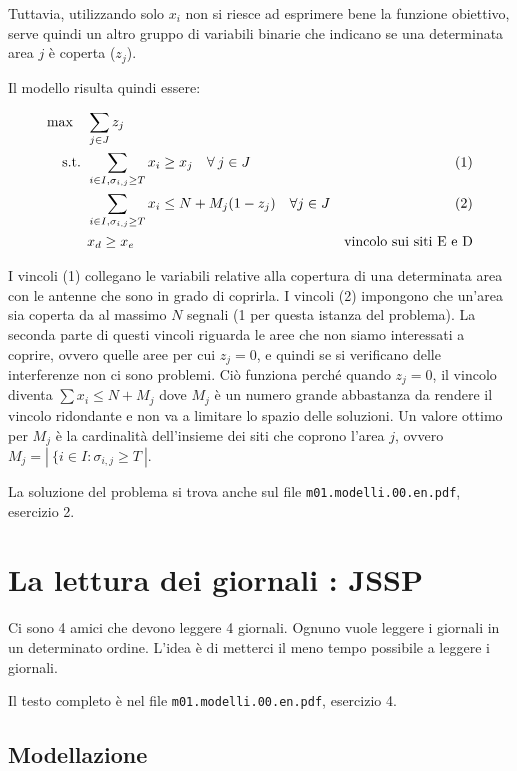 Tuttavia, utilizzando solo $x_i$ non si riesce ad esprimere bene la funzione obiettivo, serve quindi un altro gruppo di variabili binarie che indicano se una determinata area $j$ è coperta ($z_j$).

Il modello risulta quindi essere:

\begin{align*}
\max \quad & \sum\limits_{j \in J} z_j \\
\text{s.t. } & \sum\limits_{i \in I, \sigma_{i,j} \geq T} x_i \geq x_j \quad \forall \: j \in J &\text{(1)}\\
	& \sum\limits_{i \in I, \sigma_{i,j} \geq T} x_i \leq N + M_j(1-z_j) \quad \forall j \in J &\text{(2)} \\
	& x_d \geq x_e & \text{vincolo sui siti E e D}
\end{align*}

\noindent I vincoli (1) collegano le variabili relative alla copertura di una determinata area con le antenne che sono in grado di coprirla.
I vincoli (2) impongono che un'area sia coperta da al massimo $N$ segnali (1 per questa istanza del problema). 
La seconda parte di questi vincoli riguarda le aree che non siamo interessati a coprire, ovvero quelle aree per cui $z_j = 0$, e quindi se si verificano delle interferenze non ci sono problemi. Ciò funziona perché quando $z_j = 0$, il vincolo diventa $\sum x_i\leq N+M_j$ dove $M_j$ è un numero grande abbastanza da rendere il vincolo ridondante e non va a limitare lo spazio delle soluzioni.
Un valore ottimo per $M_j$ è la cardinalità dell'insieme dei siti che coprono l'area $j$, ovvero $M_j = | \: \{i \in I : \sigma_{i,j} \geq T \: |$.

La soluzione del problema si trova anche sul file \texttt{m01.modelli.00.en.pdf}, esercizio 2.

\section{La lettura dei giornali : JSSP}

Ci sono 4 amici che devono leggere 4 giornali. Ognuno vuole leggere i giornali in un determinato ordine. L'idea è di metterci il meno tempo possibile a leggere i giornali.

Il testo completo è nel file \texttt{m01.modelli.00.en.pdf}, esercizio 4.

\subsection{Modellazione}

